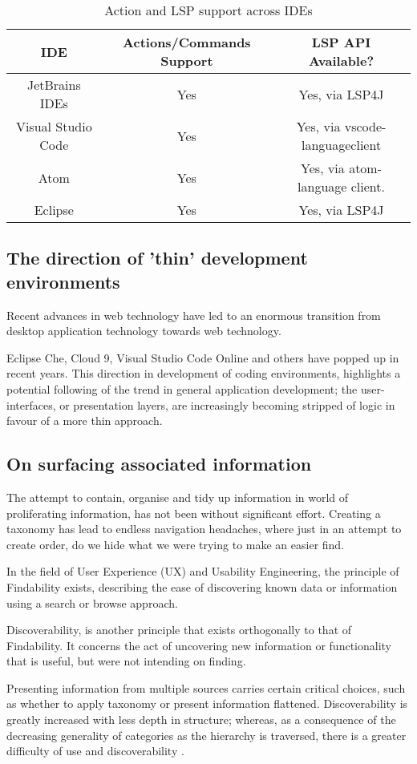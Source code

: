 \begin{table}[h!]
	\centering
	\begin{tabular}{ | c | c | c |}
		\hline
		IDE & Actions/Commands Support & LSP API Available?\\
		\hline
		\hline
		JetBrains IDEs & Yes & Yes, via LSP4J\\ 
		Visual Studio Code & Yes & Yes, via vscode-languageclient \\
		Atom & Yes & Yes, via atom-language client.\\
		Eclipse & Yes & Yes, via LSP4J\\
		\hline
	\end{tabular}
	\caption{Action and LSP support across IDEs}
	\label{table:1}
\end{table}

\subsection{The direction of 'thin' development environments}

Recent advances in web technology have led to an enormous transition from desktop application technology towards web technology. 


Eclipse Che, Cloud 9, Visual Studio Code Online and others have popped up in recent years. This direction in development of coding environments, highlights a potential following of the trend in general application development; the user-interfaces, or presentation layers, are increasingly becoming stripped of logic in favour of a more thin approach. 

\subsection{On surfacing associated information}

The attempt to contain, organise and tidy up information in world of proliferating information, has not been without significant effort. Creating a taxonomy has lead to endless navigation headaches, where just in an attempt to create order, do we hide what we were trying to make an easier find. 

In the field of User Experience (UX) and Usability Engineering, the principle of Findability exists, describing the ease of discovering known data or information using a search or browse approach.

Discoverability, is another principle that exists orthogonally to that of Findability. It concerns the act of uncovering new information or functionality that is useful, but were not intending on finding.  

Presenting information from multiple sources carries certain critical choices, such as whether to apply taxonomy or present information flattened. Discoverability is greatly increased with less depth in structure; whereas, as a consequence of the decreasing generality of categories as the hierarchy is traversed, there is a greater difficulty of use and discoverability \parencite{nielsenNormanStructure}.
